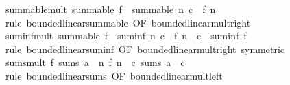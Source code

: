 \begin{isabellebody}
\endisatagproof
{\isafoldproof}%
%
\isadelimproof
\isanewline
%
\endisadelimproof
\isanewline
{}\isamarkupfalse%
\ summable{\isacharunderscore}{\kern0pt}mult{\isacharcolon}{\kern0pt}\ {\isachardoublequoteopen}summable\ f\ {\isasymLongrightarrow}\ summable\ {\isacharparenleft}{\kern0pt}{\isasymlambda}n{\isachardot}{\kern0pt}\ c\ {\isacharasterisk}{\kern0pt}\ f\ n{\isacharparenright}{\kern0pt}{\isachardoublequoteclose}\isanewline
%
\isadelimproof
\ \ %
\endisadelimproof
%
\isatagproof
{}\isamarkupfalse%
\ {\isacharparenleft}{\kern0pt}rule\ bounded{\isacharunderscore}{\kern0pt}linear{\isachardot}{\kern0pt}summable\ {\isacharbrackleft}{\kern0pt}OF\ bounded{\isacharunderscore}{\kern0pt}linear{\isacharunderscore}{\kern0pt}mult{\isacharunderscore}{\kern0pt}right{\isacharbrackright}{\kern0pt}{\isacharparenright}{\kern0pt}%
\endisatagproof
{\isafoldproof}%
%
\isadelimproof
\isanewline
%
\endisadelimproof
\isanewline
{}\isamarkupfalse%
\ suminf{\isacharunderscore}{\kern0pt}mult{\isacharcolon}{\kern0pt}\ {\isachardoublequoteopen}summable\ f\ {\isasymLongrightarrow}\ suminf\ {\isacharparenleft}{\kern0pt}{\isasymlambda}n{\isachardot}{\kern0pt}\ c\ {\isacharasterisk}{\kern0pt}\ f\ n{\isacharparenright}{\kern0pt}\ {\isacharequal}{\kern0pt}\ c\ {\isacharasterisk}{\kern0pt}\ suminf\ f{\isachardoublequoteclose}\isanewline
%
\isadelimproof
\ \ %
\endisadelimproof
%
\isatagproof
{}\isamarkupfalse%
\ {\isacharparenleft}{\kern0pt}rule\ bounded{\isacharunderscore}{\kern0pt}linear{\isachardot}{\kern0pt}suminf\ {\isacharbrackleft}{\kern0pt}OF\ bounded{\isacharunderscore}{\kern0pt}linear{\isacharunderscore}{\kern0pt}mult{\isacharunderscore}{\kern0pt}right{\isacharcomma}{\kern0pt}\ symmetric{\isacharbrackright}{\kern0pt}{\isacharparenright}{\kern0pt}%
\endisatagproof
{\isafoldproof}%
%
\isadelimproof
\isanewline
%
\endisadelimproof
\isanewline
{}\isamarkupfalse%
\ sums{\isacharunderscore}{\kern0pt}mult{}{\isacharcolon}{\kern0pt}\ {\isachardoublequoteopen}f\ sums\ a\ {\isasymLongrightarrow}\ {\isacharparenleft}{\kern0pt}{\isasymlambda}n{\isachardot}{\kern0pt}\ f\ n\ {\isacharasterisk}{\kern0pt}\ c{\isacharparenright}{\kern0pt}\ sums\ {\isacharparenleft}{\kern0pt}a\ {\isacharasterisk}{\kern0pt}\ c{\isacharparenright}{\kern0pt}{\isachardoublequoteclose}\isanewline
%
\isadelimproof
\ \ %
\endisadelimproof
%
\isatagproof
{}\isamarkupfalse%
\ {\isacharparenleft}{\kern0pt}rule\ bounded{\isacharunderscore}{\kern0pt}linear{\isachardot}{\kern0pt}sums\ {\isacharbrackleft}{\kern0pt}OF\ bounded{\isacharunderscore}{\kern0pt}linear{\isacharunderscore}{\kern0pt}mult{\isacharunderscore}{\kern0pt}left{\isacharbrackright}{\kern0pt}{\isacharparenright}{\kern0pt}%

\end{isabellebody}
